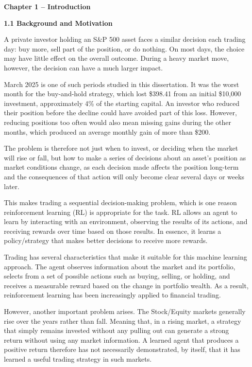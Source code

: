 \textbf{Chapter 1 -- Introduction}

\textbf{1.1 Background and Motivation}

A private investor holding an S\&P 500 asset faces a similar decision
each trading day: buy more, sell part of the position, or do nothing. On
most days, the choice may have little effect on the overall outcome.
During a heavy market move, however, the decision can have a much larger
impact.

March 2025 is one of such periods studied in this dissertation. It was
the worst month for the buy-and-hold strategy, which lost \$398.41 from
an initial \$10,000 investment, approximately 4\% of the starting
capital. An investor who reduced their position before the decline could
have avoided part of this loss. However, reducing positions too often
would also mean missing gains during the other months, which produced an
average monthly gain of more than \$200.

The problem is therefore not just when to invest, or deciding when the
market will rise or fall, but how to make a series of decisions about an
asset's position as market conditions change, as each decision made
affects the position long-term and the consequences of that action will
only become clear several days or weeks later.

This makes trading a sequential decision-making problem, which is one
reason reinforcement learning (RL) is appropriate for the task. RL
allows an agent to learn by interacting with an environment, observing
the results of its actions, and receiving rewards over time based on
those results. In essence, it learns a policy/strategy that makes better
decisions to receive more rewards.

Trading has several characteristics that make it suitable for this
machine learning approach. The agent observes information about the
market and its portfolio, selects from a set of possible actions such as
buying, selling, or holding, and receives a measurable reward based on
the change in portfolio wealth. As a result, reinforcement learning has
been increasingly applied to financial trading.

However, another important problem arises. The Stock/Equity markets
generally rise over the years rather than fall. Meaning that, in a
rising market, a strategy that simply remains invested without any
pulling out can generate a strong return without using any market
information. A learned agent that produces a positive return therefore
has not necessarily demonstrated, by itself, that it has learned a
useful trading strategy in such markets.

